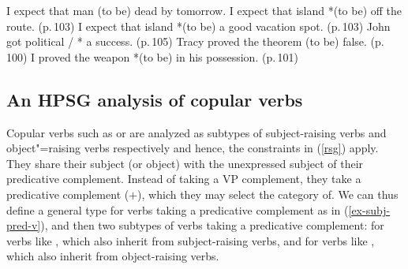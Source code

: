 \eal
\label{ex-expect}
\ex I expect that man (to be) dead  by tomorrow. \citep[]{PollardandSag1994}
\ex I expect that island *(to be) off the route. (p.\,103)
\ex I expect that island *(to be) a good vacation spot. (p.\,103)
\zl
\ea
\label{ex-get}
John got political / * a success. (p.\,105)	
\z
\eal
\label{ex-prove}
\ex Tracy proved the theorem (to be) false. (p.\,100)
\ex I proved the weapon *(to be) in his possession.	(p.\,101)
\zl
	


\subsection{An HPSG analysis of copular verbs}
\label{control-sec-copula-verbs}
	
Copular verbs such as  or  are analyzed as subtypes of subject-raising verbs
and object"=raising verbs respectively and hence, the constraints in (\ref{rsg}) apply. They share their subject (or object) with the
unexpressed subject of their predicative complement. Instead of taking a VP complement, they take a
predicative complement (\prd $+$), which they may select the category of.  We can thus define a general type for verbs taking a predicative complement as in (\ref{ex-subj-pred-v}), 
and then two subtypes of verbs taking a predicative complement:   for verbs like , which also inherit from subject-raising verbs, and  for verbs like , which also inherit from object-raising verbs.

\eal
\label{ex-subj-pred-v}
 \impl  {}
\zl

